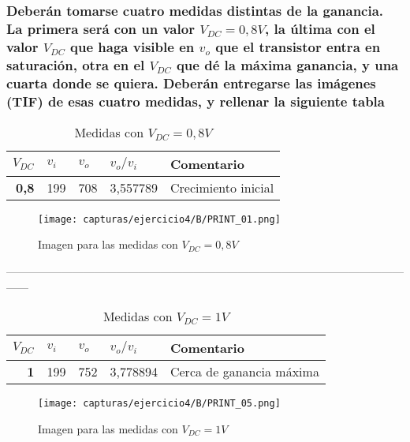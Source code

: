 \subsubsection{Deberán tomarse cuatro medidas distintas de la ganancia. La primera será con un valor $ V_{DC}=0,8V $, la
	última con el valor $ V_{DC} $ que haga visible en $ v_{o} $ que el transistor entra en saturación, otra en el $ V_{DC} $ que
	dé la máxima ganancia, y una cuarta donde se quiera.
	Deberán entregarse las imágenes (TIF) de esas cuatro medidas, y rellenar la siguiente tabla}
\vspace{-20pt}
\begin{table}[H]
	\centering
	\caption{Medidas con $ V_{DC} = 0,8 V $}
	\begin{tabular}{rrrrl}
		\multicolumn{1}{l}{\textbf{$ V_{DC} $}} & \multicolumn{1}{l}{\textbf{$ v_{i} $}} & \multicolumn{1}{l}{\textbf{$ v_{o} $}} & \multicolumn{1}{l}{\textbf{$ v_{o}/v_{i} $}} & \textbf{Comentario} \\
		\midrule
		\textbf{0,8}   & 199   & 708   & 3,557789 & Crecimiento inicial  \\
	\end{tabular}%
	\label{tab:p4b1}%
\end{table}%
\vspace{-20pt}
\begin{figure}[H] %
	\centering
	\texttt{[image: capturas/ejercicio4/B/PRINT\_01.png]} 
	\caption{Imagen para las medidas con $ V_{DC} = 0,8 V $}
	\label{fig:practica4-b-3}
\end{figure}
\vspace{-20pt}
------------------------------------------------------------------------------------------------------------------
\vspace{-15pt}
\begin{table}[H]
	\centering
	\caption{Medidas con $ V_{DC} = 1 V $}
	\begin{tabular}{rrrrl}
		\multicolumn{1}{l}{\textbf{$ V_{DC} $}} & \multicolumn{1}{l}{\textbf{$ v_{i} $}} & \multicolumn{1}{l}{\textbf{$ v_{o} $}} & \multicolumn{1}{l}{\textbf{$ v_{o}/v_{i} $}} & \textbf{Comentario} \\
		\midrule
		\textbf{1}     & 199   & 752   & 3,778894 & Cerca de ganancia máxima 
		 \\
	\end{tabular}%
	\label{tab:p4b2}%
\end{table}%
\vspace{-20pt}
\begin{figure}[H] %
	\centering
	\texttt{[image: capturas/ejercicio4/B/PRINT\_05.png]} 
	\caption{Imagen para las medidas con $ V_{DC} = 1 V $}
	\label{fig:practica4-b-4}
\end{figure}


